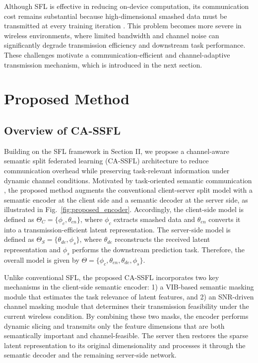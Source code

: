 Although SFL is effective in reducing on-device computation, its communication cost remains substantial because high-dimensional smashed data must be transmitted at every training iteration \cite{gao2020end}. This problem becomes more severe in wireless environments, where limited bandwidth and channel noise can significantly degrade transmission efficiency and downstream task performance. These challenges motivate a communication-efficient and channel-adaptive transmission mechanism, which is introduced in the next section.

\section{Proposed Method}

\subsection{Overview of CA-SSFL}
Building on the SFL framework in Section II, we propose a channel-aware semantic split federated learning (CA-SSFL) architecture to reduce communication overhead while preserving task-relevant information under dynamic channel conditions. Motivated by task-oriented semantic communication \cite{qin2021semantic,gunduz2022beyond}, the proposed method augments the conventional client-server split model with a semantic encoder at the client side and a semantic decoder at the server side, as illustrated in Fig.~\ref{fig:proposed_encoder}. Accordingly, the client-side model is defined as $\Theta_C = \{\phi_c, \theta_{en}\}$, where $\phi_c$ extracts smashed data and $\theta_{en}$ converts it into a transmission-efficient latent representation. The server-side model is defined as $\Theta_S = \{\theta_{de}, \phi_s\}$, where $\theta_{de}$ reconstructs the received latent representation and $\phi_s$ performs the downstream prediction task. Therefore, the overall model is given by $\Theta = \{\phi_c, \theta_{en}, \theta_{de}, \phi_s\}$.

Unlike conventional SFL, the proposed CA-SSFL incorporates two key mechanisms in the client-side semantic encoder: 1) a VIB-based semantic masking module that estimates the task relevance of latent features, and 2) an SNR-driven channel masking module that determines their transmission feasibility under the current wireless condition. By combining these two masks, the encoder performs dynamic slicing and transmits only the feature dimensions that are both semantically important and channel-feasible. The server then restores the sparse latent representation to its original dimensionality and processes it through the semantic decoder and the remaining server-side network.

